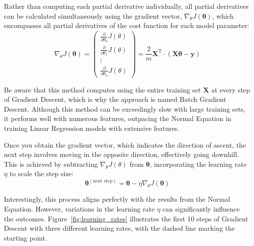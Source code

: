 \documentclass[12pt,letter]{article}
\begin{document}
Rather than computing each partial derivative individually, all partial derivatives can be calculated simultaneously using the gradient vector, $\nabla_\theta J(\pmb{\theta})$, which encompasses all partial derivatives of the cost function for each model parameter:
\begin{equation}
	\nabla_\theta J(\pmb{\theta}) = \begin{pmatrix}
	\frac{\partial}{\partial \theta_0} J(\theta) \\
	\frac{\partial}{\partial \theta_1} J(\theta) \\
	\vdots  \\
	\frac{\partial}{\partial \theta_n} J(\theta)
	\end{pmatrix}
	= \frac{2}{m} \textbf{X}^\text{T} \cdot (\textbf{X} \pmb{\theta} - \textbf{y})
\end{equation}

\begin{mdframed}[middlelinewidth=0.5mm]
\begin{center}
\end{center}
Be aware that this method computes using the entire training set $\textbf{X}$ at every step of Gradient Descent, which is why the approach is named Batch Gradient Descent. Although this method can be exceedingly slow with large training sets, it performs well with numerous features, outpacing the Normal Equation in training Linear Regression models with extensive features.
\end{mdframed}

Once you obtain the gradient vector, which indicates the direction of ascent, the next step involves moving in the opposite direction, effectively going downhill. This is achieved by subtracting $\nabla_\theta J(\theta)$ from $\pmb{\theta}$, incorporating the learning rate $\eta$ to scale the step size:
\begin{equation}
\pmb{\theta}^{(\text{next step})} = \pmb{\theta} - \eta \nabla_\theta J(\pmb{\theta})
\end{equation}

Interestingly, this process aligns perfectly with the results from the Normal Equation. However, variations in the learning rate $\eta$ can significantly influence the outcomes. Figure~\ref{fig:learning_rates} illustrates the first 10 steps of Gradient Descent with three different learning rates, with the dashed line marking the starting point.
\end{document}
